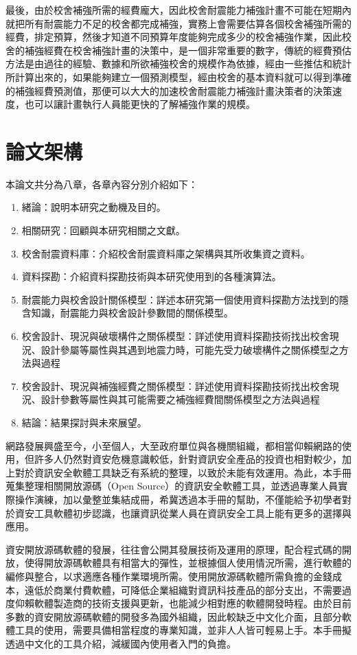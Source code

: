 最後，由於校舍補強所需的經費龐大，因此校舍耐震能力補強計畫不可能在短期內就把所有耐震能力不足的校舍都完成補強，實務上會需要估算各個校舍補強所需的經費，排定預算，然後才知道不同預算年度能夠完成多少的校舍補強作業，因此校舍的補強經費在校舍補強計畫的決策中，是一個非常重要的數字，傳統的經費預估方法是由過往的經驗、數據和所欲補強校舍的規模作為依據，經由一些推估和統計所計算出來的，如果能夠建立一個預測模型，經由校舍的基本資料就可以得到準確的補強經費預測值，那便可以大大的加速校舍耐震能力補強計畫決策者的決策速度，也可以讓計畫執行人員能更快的了解補強作業的規模。

\section{論文架構}

本論文共分為八章，各章內容分別介紹如下：

\begin{enumerate}
\item 緒論：說明本研究之動機及目的。
\item 相關研究：回顧與本研究相關之文獻。
\item 校舍耐震資料庫：介紹校舍耐震資料庫之架構與其所收集資之資料。
\item 資料探勘：介紹資料探勘技術與本研究使用到的各種演算法。
\item 耐震能力與校舍設計關係模型：詳述本研究第一個使用資料探勘方法找到的隱含知識，耐震能力與校舍設計參數間的關係模型。
\item 校舍設計、現況與破壞構件之關係模型：詳述使用資料探勘技術找出校舍現況、設計參屬等屬性與其遇到地震力時，可能先受力破壞構件之關係模型之方法與過程
\item 校舍設計、現況與補強經費之關係模型：詳述使用資料探勘技術找出校舍現況、設計參數等屬性與其可能需要之補強經費間關係模型之方法與過程
\item 結論：結果探討與未來展望。
\end{enumerate}



網路發展興盛至今，小至個人，大至政府單位與各機關組織，都相當仰賴網路的使用，但許多人仍然對資安危機意識較低，針對資訊安全產品的投資也相對較少，加上對於資訊安全軟體工具缺乏有系統的整理，以致於未能有效運用。為此，本手冊蒐集整理相關開放源碼（Open Source）的資訊安全軟體工具，並透過專業人員實際操作演練，加以彙整並集結成冊，希冀透過本手冊的幫助，不僅能給予初學者對於資安工具軟體初步認識，也讓資訊從業人員在資訊安全工具上能有更多的選擇與應用。

資安開放源碼軟體的發展，往往會公開其發展技術及運用的原理，配合程式碼的開放，使得開放源碼軟體具有相當大的彈性，並根據個人使用情況所需，進行軟體的編修與整合，以求適應各種作業環境所需。使用開放源碼軟體所需負擔的金錢成本，遠低於商業付費軟體，可降低企業組織對資訊科技產品的部分支出，不需要過度仰賴軟體製造商的技術支援與更新，也能減少相對應的軟體開發時程。由於目前多數的資安開放源碼軟體的開發多為國外組織，因此較缺乏中文化介面，且部分軟體工具的使用，需要具備相當程度的專業知識，並非人人皆可輕易上手。本手冊擬透過中文化的工具介紹，減緩國內使用者入門的負擔。


